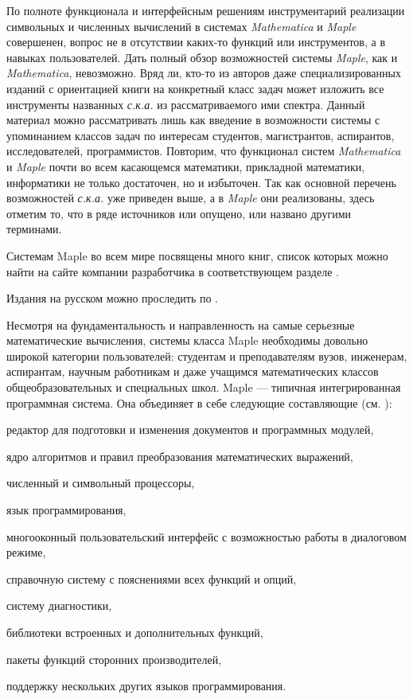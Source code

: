 По полноте функционала и интерфейсным решениям инструментарий реализации символьных и численных вычислений в системах \textit{Mathematica} и \textit{Maple} совершенен, вопрос не в отсутствии каких-то функций или инструментов, а в навыках пользователей.
Дать полный обзор возможностей системы \textit{Maple}, как и \textit{Mathematica}, невозможно. Вряд ли, кто-то из авторов даже специализированных изданий с ориентацией книги на конкретный класс задач может изложить все инструменты названных \textit{с.к.а.} из рассматриваемого ими спектра. Данный материал можно рассматривать лишь как введение в возможности системы с упоминанием классов задач по интересам студентов, магистрантов, аспирантов, исследователей, программистов. Повторим, что функционал систем \textit{Mathematica} и \textit{Maple} почти во всем касающемся математики, прикладной математики, информатики не только достаточен, но и избыточен. Так как основной перечень возможностей \textit{с.к.а.} уже приведен выше, а в \textit{Maple} они реализованы, здесь отметим то, что в ряде источников или опущено, или названо другими терминами.

Системам Maple во всем мире посвящены много книг, список которых можно найти на сайте компании разработчика в соответствующем разделе .

Издания на русском можно проследить по . 

Несмотря на фундаментальность и направленность на самые серьезные математические вычисления, системы класса Maple необходимы довольно широкой категории пользователей: студентам и преподавателям вузов, инженерам, аспирантам, научным работникам и даже учащимся математических классов общеобразовательных и специальных школ.
Maple --- типичная интегрированная программная система. Она объединяет в себе следующие составляющие (см. ):
\begin{textitemize}
	\item редактор для подготовки и изменения документов и программных модулей, 
	\item ядро алгоритмов и правил преобразования математических выражений, 
	\item численный и символьный процессоры, 
	\item язык программирования, 
	\item многооконный пользовательский интерфейс с возможностью работы в диалоговом режиме, 
	\item справочную систему с пояснениями всех функций и опций, 
	\item систему диагностики, 
	\item библиотеки встроенных и дополнительных функций, 
	\item пакеты функций сторонних производителей, 
	\item поддержку нескольких других языков программирования.
\end{textitemize}

